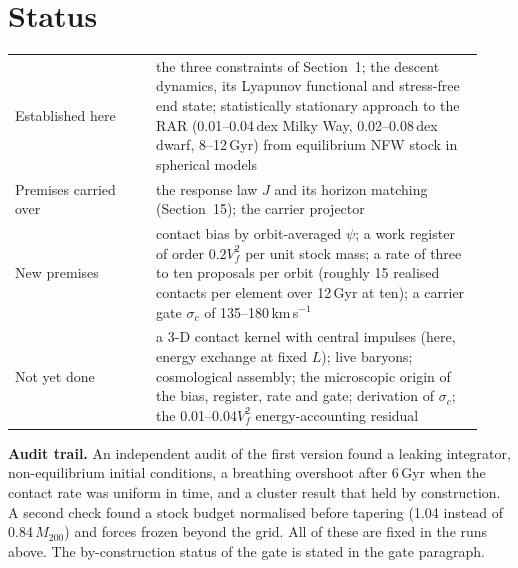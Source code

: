 \section{Status}
\begin{center}\small
\begin{tabular}{p{0.28\linewidth}p{0.65\linewidth}}\toprule
Established here & the three constraints of Section~1; the descent dynamics, its Lyapunov functional and stress-free end state; statistically stationary approach to the RAR (0.01--0.04\,dex Milky Way, 0.02--0.08\,dex dwarf, 8--12\,Gyr) from equilibrium NFW stock in spherical models\\
Premises carried over & the response law $J$ and its horizon matching (Section~15); the carrier projector\\
New premises & contact bias by orbit-averaged $\psi$; a work register of order $0.2V_f^2$ per unit stock mass; a rate of three to ten proposals per orbit (roughly 15 realised contacts per element over 12\,Gyr at ten); a carrier gate $\sigma_c$ of 135--180\,km\,s$^{-1}$\\
Not yet done & a 3-D contact kernel with central impulses (here, energy exchange at fixed $L$); live baryons; cosmological assembly; the microscopic origin of the bias, register, rate and gate; derivation of $\sigma_c$; the 0.01--0.04$V_f^2$ energy-accounting residual\\
\bottomrule\end{tabular}\end{center}

\textbf{Audit trail.} An independent audit of the first version found a leaking integrator, non-equilibrium initial conditions, a breathing overshoot after 6\,Gyr when the contact rate was uniform in time, and a cluster result that held by construction. A second check found a stock budget normalised before tapering (1.04 instead of 0.84\,$M_{200}$) and forces frozen beyond the grid. All of these are fixed in the runs above. The by-construction status of the gate is stated in the gate paragraph.

